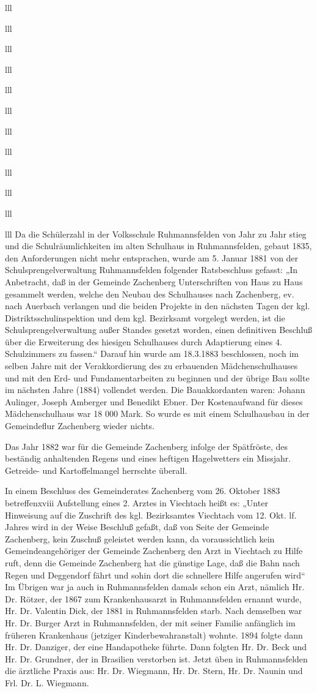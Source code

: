 \documentclass[12pt,a4pager]{book}
\begin{document}
\begin{tabuluar}{lll}
\begin{tabuluar}{lll}
\begin{tabuluar}{lll}
\begin{tabuluar}{lll}
\begin{tabuluar}{lll}
\begin{tabuluar}{lll}
\begin{tabuluar}{lll}
\begin{tabuluar}{lll}
\begin{tabuluar}{lll}
\begin{tabuluar}{lll}
\begin{tabuluar}{lll}
\begin{tabuluar}{lll}
Da die Schülerzahl in der Volksschule Ruhmannsfelden von Jahr zu Jahr stieg und
die Schulräumlichkeiten im alten Schulhaus in Ruhmannsfelden, gebaut 1835, den
Anforderungen nicht mehr entsprachen, wurde am 5. Januar 1881 von der
Schulsprengelverwaltung Ruhmannsfelden folgender Ratsbeschluss gefasst: „In
Anbetracht, daß in der Gemeinde Zachenberg Unterschriften von Haus zu Haus
gesammelt werden, welche den Neubau des Schulhauses nach Zachenberg, ev. nach
Auerbach verlangen und die beiden Projekte in den nächsten Tagen der kgl.
Distriktsschulinspektion und dem kgl. Bezirksamt vorgelegt werden, ist die
Schulsprengelverwaltung außer Standes gesetzt worden, einen definitiven Beschluß
über die Erweiterung des hiesigen Schulhauses durch Adaptierung eines 4.
Schulzimmers zu fassen.“ Darauf hin wurde am 18.3.1883 beschlossen, noch im
selben Jahre mit der Verakkordierung des zu erbauenden Mädchenschulhauses und
mit den Erd- und Fundamentarbeiten zu beginnen und der übrige Bau sollte im
nächsten Jahre (1884) vollendet werden. Die Bauakkordanten waren: Johann
Aulinger, Joseph Amberger und Benedikt Ebner. Der Kostenaufwand für dieses
Mädchenschulhaus war 18 000 Mark. So wurde es mit einem Schulhausbau in der
Gemeindeflur Zachenberg wieder nichts.

Das Jahr 1882 war für die Gemeinde Zachenberg infolge der Spätfröste, des
beständig anhaltenden Regens und eines heftigen Hagelwetters ein Missjahr.
Getreide- und Kartoffelmangel herrschte überall.

In einem Beschluss des Gemeinderates Zachenberg vom 26. Oktober 1883
betreffenxviii Aufstellung eines 2. Arztes in Viechtach heißt es: „Unter
Hinweisung auf die Zuschrift des kgl. Bezirksamtes Viechtach vom 12. Okt. lf.
Jahres wird in der Weise Beschluß gefaßt, daß von Seite der Gemeinde Zachenberg,
kein Zuschuß geleistet werden kann, da voraussichtlich kein Gemeindeangehöriger
der Gemeinde Zachenberg den Arzt in Viechtach zu Hilfe ruft, denn die Gemeinde
Zachenberg hat die günstige Lage, daß die Bahn nach Regen und Deggendorf fährt
und sohin dort die schnellere Hilfe angerufen wird“ Im Übrigen war ja auch in
Ruhmannsfelden damals schon ein Arzt, nämlich Hr. Dr. Rötzer, der 1867 zum
Krankenhausarzt in Ruhmannsfelden ernannt wurde, Hr. Dr. Valentin Dick, der 1881
in Ruhmannsfelden starb. Nach demselben war Hr. Dr. Burger Arzt in
Ruhmannsfelden, der mit seiner Familie anfänglich im früheren Krankenhaus
(jetziger Kinderbewahranstalt) wohnte. 1894 folgte dann Hr. Dr. Danziger, der
eine Handapotheke führte. Dann folgten Hr. Dr. Beck und Hr. Dr. Grundner, der in
Brasilien verstorben ist. Jetzt üben in Ruhmannsfelden die ärztliche Praxis aus:
Hr. Dr. Wiegmann, Hr. Dr. Stern, Hr. Dr. Naunin und Frl. Dr. L. Wiegmann.


\end{tabuluar}
\end{tabuluar}
\end{tabuluar}
\end{tabuluar}
\end{tabuluar}
\end{tabuluar}
\end{tabuluar}
\end{tabuluar}
\end{tabuluar}
\end{tabuluar}
\end{tabuluar}
\end{tabuluar}
\end{document}
